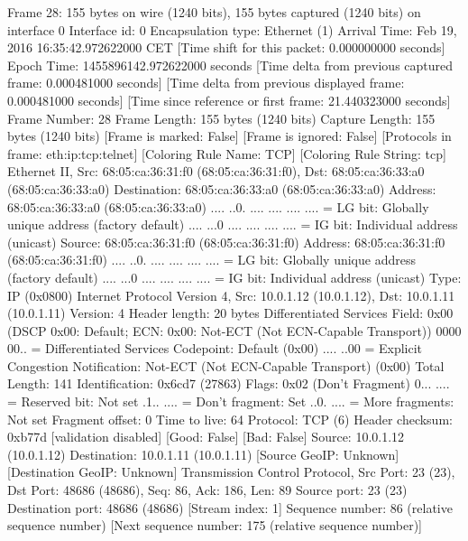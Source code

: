 Frame 28: 155 bytes on wire (1240 bits), 155 bytes captured (1240 bits) on interface 0
    Interface id: 0
    Encapsulation type: Ethernet (1)
    Arrival Time: Feb 19, 2016 16:35:42.972622000 CET
    [Time shift for this packet: 0.000000000 seconds]
    Epoch Time: 1455896142.972622000 seconds
    [Time delta from previous captured frame: 0.000481000 seconds]
    [Time delta from previous displayed frame: 0.000481000 seconds]
    [Time since reference or first frame: 21.440323000 seconds]
    Frame Number: 28
    Frame Length: 155 bytes (1240 bits)
    Capture Length: 155 bytes (1240 bits)
    [Frame is marked: False]
    [Frame is ignored: False]
    [Protocols in frame: eth:ip:tcp:telnet]
    [Coloring Rule Name: TCP]
    [Coloring Rule String: tcp]
Ethernet II, Src: 68:05:ca:36:31:f0 (68:05:ca:36:31:f0), Dst: 68:05:ca:36:33:a0 (68:05:ca:36:33:a0)
    Destination: 68:05:ca:36:33:a0 (68:05:ca:36:33:a0)
        Address: 68:05:ca:36:33:a0 (68:05:ca:36:33:a0)
        .... ..0. .... .... .... .... = LG bit: Globally unique address (factory default)
        .... ...0 .... .... .... .... = IG bit: Individual address (unicast)
    Source: 68:05:ca:36:31:f0 (68:05:ca:36:31:f0)
        Address: 68:05:ca:36:31:f0 (68:05:ca:36:31:f0)
        .... ..0. .... .... .... .... = LG bit: Globally unique address (factory default)
        .... ...0 .... .... .... .... = IG bit: Individual address (unicast)
    Type: IP (0x0800)
Internet Protocol Version 4, Src: 10.0.1.12 (10.0.1.12), Dst: 10.0.1.11 (10.0.1.11)
    Version: 4
    Header length: 20 bytes
    Differentiated Services Field: 0x00 (DSCP 0x00: Default; ECN: 0x00: Not-ECT (Not ECN-Capable Transport))
        0000 00.. = Differentiated Services Codepoint: Default (0x00)
        .... ..00 = Explicit Congestion Notification: Not-ECT (Not ECN-Capable Transport) (0x00)
    Total Length: 141
    Identification: 0x6cd7 (27863)
    Flags: 0x02 (Don't Fragment)
        0... .... = Reserved bit: Not set
        .1.. .... = Don't fragment: Set
        ..0. .... = More fragments: Not set
    Fragment offset: 0
    Time to live: 64
    Protocol: TCP (6)
    Header checksum: 0xb77d [validation disabled]
        [Good: False]
        [Bad: False]
    Source: 10.0.1.12 (10.0.1.12)
    Destination: 10.0.1.11 (10.0.1.11)
    [Source GeoIP: Unknown]
    [Destination GeoIP: Unknown]
Transmission Control Protocol, Src Port: 23 (23), Dst Port: 48686 (48686), Seq: 86, Ack: 186, Len: 89
    Source port: 23 (23)
    Destination port: 48686 (48686)
    [Stream index: 1]
    Sequence number: 86    (relative sequence number)
    [Next sequence number: 175    (relative sequence number)]
